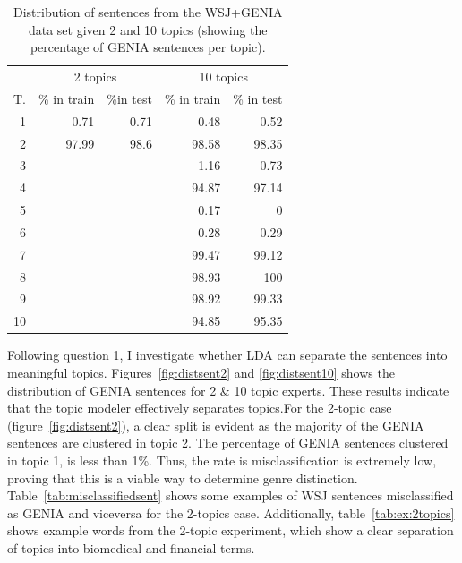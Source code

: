
\begin{table}[t!]
	\begin{center}
		\begin{tabular}{r|rr|rr} 
			& \multicolumn{2}{c|}{2 topics} & \multicolumn{2}{c}{10 topics}\\
			T. &\% in train & \%in test & \% in train & \% in test \\ 
			\hline
			1 	& 0.71	& 	0.71 	& 0.48 	& 0.52		\\ 
			2 	& 97.99	& 	98.6	& 98.58 	& 98.35				\\
			3 	& 		& 			& 1.16 	& 0.73			\\ 
			4 	& 		& 			& 94.87	& 97.14		\\
			5 	& 		& 			& 0.17	& 0			\\  
			6 	& 		& 			& 0.28 	& 0.29				\\  
			7 	& 		& 			& 99.47	& 99.12			\\  
			8 	& 		& 			& 98.93 	& 100		\\ 
			9 	& 		& 			& 98.92	& 99.33			\\ 
			10 	& 		&			& 94.85 	& 95.35			\\   
			\hline 
		\end{tabular}
	\end{center}
	\caption{Distribution of sentences from the WSJ+GENIA data set given 2 and 10 topics (showing the percentage of GENIA sentences per topic).\label{tab:cluster}}
\end{table}

Following question 1, I investigate whether LDA can separate the sentences into meaningful topics. 
Figures~\ref{fig:distsent2} and \ref{fig:distsent10} shows the distribution of GENIA sentences for 2 \& 10 topic experts. These results indicate that the topic modeler effectively separates topics.For the 2-topic case (figure~\ref{fig:distsent2}), a clear split is evident as the majority of the GENIA sentences are clustered in topic 2. The percentage of GENIA sentences clustered in topic 1, is less than 1\%. Thus, the rate is misclassification is extremely low, proving that this is a viable way to determine genre distinction. Table~\ref{tab:misclassifiedsent} shows some examples of WSJ sentences misclassified as GENIA and viceversa for the 2-topics case. Additionally, table~\ref{tab:ex:2topics} shows example words from the 2-topic experiment, which show a clear separation of topics into biomedical and financial terms.

